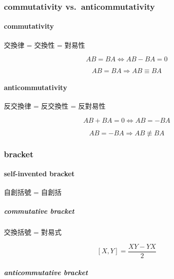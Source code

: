 \documentclass[
]{book}
\theoremstyle{definition}
\theoremstyle{definition}
\theoremstyle{definition}
\theoremstyle{definition}
\theoremstyle{remark}
\begin{document}
\subsubsection{commutativity vs.~anticommutativity}\label{commutativity-vs.-anticommutativity}

\paragraph{commutativity}\label{commutativity}

\begin{CJK}{UTF8}{bsmi}
交換律 = 交換性 = 對易性
\end{CJK}

\[
AB=BA\Leftrightarrow AB-BA=0
\]

\[
AB=BA\Rightarrow AB\equiv BA
\]

\paragraph{anticommutativity}\label{anticommutativity}

\begin{CJK}{UTF8}{bsmi}
反交換律 = 反交換性 = 反對易性
\end{CJK}

\[
AB+BA=0\Leftrightarrow AB=-BA
\]

\[
AB=-BA\Rightarrow AB\not\equiv BA
\]

\subsubsection{bracket}\label{bracket}

\paragraph{self-invented bracket}\label{self-invented-bracket}

\begin{CJK}{UTF8}{bsmi}
自創括號 = 自創括
\end{CJK}

\subparagraph{commutative bracket}\label{commutative-bracket}

\begin{CJK}{UTF8}{bsmi}
交換括號 = 對易式
\end{CJK}

\[
\left[X,Y\right]=\dfrac{XY-YX}{2}
\]

\subparagraph{anticommutative bracket}\label{anticommutative-bracket}
\end{document}
